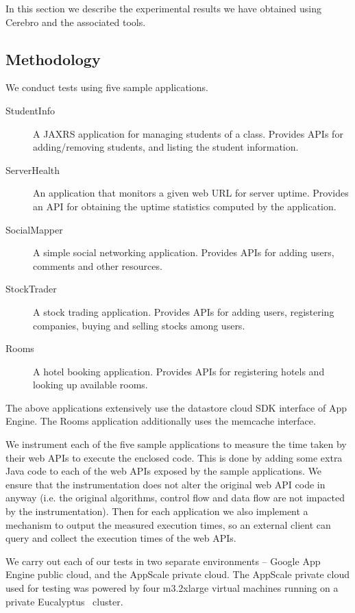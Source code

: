 In this section we describe the experimental results we have obtained using Cerebro and the associated tools. 

\subsection{Methodology}
We conduct tests using five sample applications. 

\begin{description}
\item[StudentInfo] A JAXRS application for managing students of a class. Provides APIs for
adding/removing students, and listing the student information.
\item[ServerHealth] An application that monitors a given web URL for server uptime. Provides an
API for obtaining the uptime statistics computed by the application.
\item[SocialMapper] A simple social networking application. Provides APIs for adding users,
comments and other resources.
\item[StockTrader] A stock trading application. Provides APIs for adding users, registering
companies, buying and selling stocks among users.
\item[Rooms] A hotel booking application. Provides APIs for registering hotels and looking up
available rooms.
\end{description}

The above applications extensively use the datastore cloud SDK interface of App Engine. The Rooms application
additionally uses the memcache interface.

We instrument each of the five sample applications to measure the time taken by their web APIs to execute the
enclosed code. This is done by adding some extra Java code to each of the web APIs exposed by the sample applications.
We ensure that the instrumentation does not alter the original web API code in anyway (i.e. the original algorithms, control flow
and data flow are not impacted by the instrumentation). Then for each application we also
implement a mechanism to output the measured execution times, so an external client can query and collect the execution
times of the web APIs.

We carry out each of our tests in two separate environments -- Google App Engine public cloud, and
the AppScale private cloud. The AppScale private cloud used for testing was powered by four m3.2xlarge virtual machines 
running on a private Eucalyptus~\cite{eucalyptus09} cluster.


